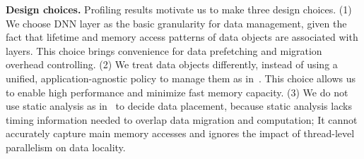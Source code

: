\textcolor{check}{\textbf{Design choices.} Profiling results motivate us to make three design choices. (1) We choose DNN layer as the basic granularity for data management, given the fact that lifetime and memory access patterns of data objects are associated with layers. This choice brings convenience for data prefetching and migration overhead controlling. (2) We treat data objects differently, instead of using a unified, application-agnostic policy to manage them as in~\cite{Yan:ASPLOS19, unimem:sc17, sc18:wu}. This choice allows us to enable high performance and minimize fast memory capacity. (3) We do not use static analysis as in~\cite{pldi19:panthera} to decide data placement, because static analysis lacks timing information needed to overlap data migration and computation; It cannot accurately capture main memory accesses and ignores the impact of thread-level parallelism on data locality.}




